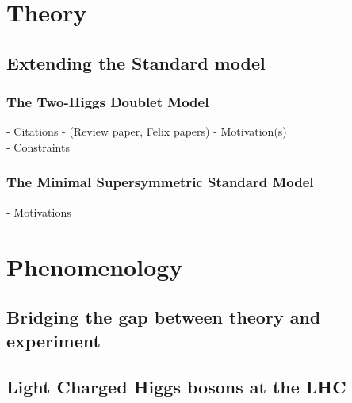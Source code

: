 \documentclass[ %
                openright,
                titlepage,numbers=noenddot,headinclude,%
                footinclude=true,cleardoublepage=empty,abstractoff, 
                BCOR=0mm,paper=a4,fontsize=10pt,
                ngerman,american,
                ]{scrreprt}
\begin{document}
\frenchspacing
\raggedbottom
\pagestyle{plain}




\cleardoublepage
\pagestyle{scrheadings}
\cleardoublepage
\cleardoublepage{}
\part{Theory}


\chapter{Extending the Standard model}
\section{The Two-Higgs Doublet Model}\label{the-two-higgs-doublet-model}
- Citations - (Review paper, Felix papers)
- Motivation(s) \\
- Constraints \\  
\section{The Minimal Supersymmetric Standard Model}\label{the-minimal-supersymmetric-standard-model}
- Motivations \\
\indent 

\part{Phenomenology}
\chapter{Bridging the gap between theory and experiment}
\chapter{Light Charged Higgs bosons at the LHC}
\end{document}
